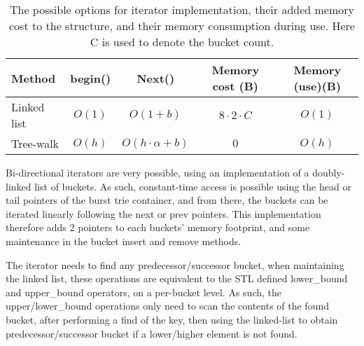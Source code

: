 \begin{table}[h!]
    \centering
    \begin{tabular}[here]{ l | c | c | c | c}
        Method      & begin() & Next()           & Memory cost (B) & Memory (use)(B) \\ \hline
        Linked list & $O(1)$  & $O(1 + b) $      & $8\cdot2\cdot C$      & $O(1)$ \\
        Tree-walk   & $O(h)$  & $O(h \cdot \alpha + b)$ & $0$             & $O(h)$ \\ \hline
    \end{tabular}
    \caption{The possible options for iterator implementation, their added
    memory cost to the structure, and their memory consumption during use. Here
    C is used to denote the bucket count.}

    \label{tab:stats:iterator}
\end{table}

Bi-directional iterators are very possible, using an implementation of a
doubly-linked list of buckets. As such, constant-time access is possible using
the {\keyword head} or {\keyword tail} pointers of the burst trie container,
and from there, the buckets can be iterated linearly following the {\keyword
next} or {\keyword prev} pointers. This implementation therefore adds 2
pointers to each buckets' memory footprint, and some maintenance in the bucket
insert and remove methods.

The iterator needs to find any predecessor/successor bucket, when maintaining
the linked list, these operations are equivalent to the STL defined {\keyword
lower\_bound} and {\keyword upper\_bound} operators, on a per-bucket level. As such, the
{\keyword upper/lower\_bound} operations only need to scan the contents of the
found bucket, after performing a {\keyword find} of the key, then using the
linked-list to obtain predecessor/successor bucket if a lower/higher element is
not found.

